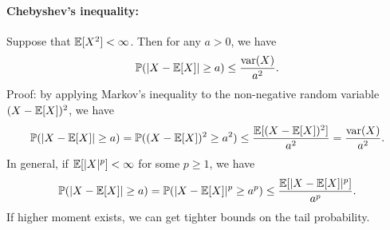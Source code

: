 \documentclass[11pt,letterpaper]{article}
\begin{document}
\paragraph{Chebyshev's inequality:} Suppose that ${\mathbb{E}} [X^2] < \infty$. Then for any $a > 0$, we have
\begin{align*}
  {\mathbb{P}}(|X - {\mathbb{E}}[X]| \geq a) \leq \frac{\operatorname{var}(X)}{a^2}.
\end{align*}
Proof: by applying Markov's inequality to the non-negative random variable $(X - {\mathbb{E}}[X])^2$, we have
\begin{align*}
  {\mathbb{P}}(|X - {\mathbb{E}}[X]| \geq a) = {\mathbb{P}}((X - {\mathbb{E}}[X])^2 \geq a^2) \leq \frac{{\mathbb{E}}[(X - {\mathbb{E}}[X])^2]}{a^2} = \frac{\operatorname{var}(X)}{a^2}.
\end{align*}
In general, if ${\mathbb{E}}[|X|^p] < \infty$ for some $p \geq 1$, we have
\begin{align*}
  {\mathbb{P}}(|X - {\mathbb{E}}[X]| \geq a) = {\mathbb{P}}(|X - {\mathbb{E}}[X]|^p \geq a^p) \leq \frac{{\mathbb{E}}[|X - {\mathbb{E}}[X]|^p]}{a^p}.
\end{align*}
If higher moment exists, we can get tighter bounds on the tail probability.
\end{document}
